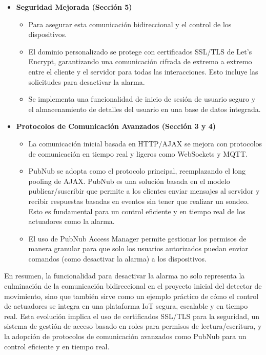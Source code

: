 \documentclass{report}
\begin{document}
\begin{itemize}
\begin{itemize}
        \item \textbf{Seguridad Mejorada (Sección 5)}
        \begin{itemize}
            \item Para asegurar esta comunicación bidireccional y el control de los dispositivos.
            \item El dominio personalizado se protege con certificados SSL/TLS de Let's Encrypt, garantizando una comunicación cifrada de extremo a extremo 
            entre el cliente y el servidor para todas las interacciones. Esto incluye las solicitudes para desactivar la alarma.
            \item Se implementa una funcionalidad de inicio de sesión de usuario seguro y el almacenamiento de detalles del usuario en una base de datos 
            integrada.
        \end{itemize}

        \item \textbf{Protocolos de Comunicación Avanzados (Sección 3 y 4)}
        \begin{itemize}
            \item La comunicación inicial basada en HTTP/AJAX se mejora con protocolos de comunicación en tiempo real y ligeros como WebSockets y MQTT.
            \item PubNub se adopta como el protocolo principal, reemplazando el long pooling de AJAX. PubNub es una solución basada en el modelo 
            publicar/suscribir que permite a los clientes enviar mensajes al servidor y recibir respuestas basadas en eventos sin tener que realizar 
            un sondeo. Esto es fundamental para un control eficiente y en tiempo real de los actuadores como la alarma.
            \item El uso de PubNub Access Manager permite gestionar los permisos de manera granular para que solo los usuarios autorizados puedan enviar 
            comandos (como desactivar la alarma) a los dispositivos.
        \end{itemize}
    \end{itemize}

\end{itemize}
En resumen, la funcionalidad para desactivar la alarma no solo representa la culminación de la comunicación bidireccional en el proyecto inicial del 
detector de movimiento, sino que también sirve como un ejemplo práctico de cómo el control de actuadores se integra en una plataforma IoT segura, escalable 
y en tiempo real. Esta evolución implica el uso de certificados SSL/TLS para la seguridad, un sistema de gestión de acceso basado en roles para permisos 
de lectura/escritura, y la adopción de protocolos de comunicación avanzados como PubNub para un control eficiente y en tiempo real.
\end{document}
